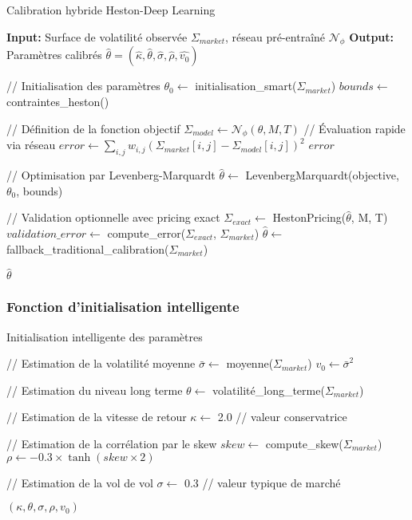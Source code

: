 \begin{algorithm}[H]
\caption{Calibration hybride Heston-Deep Learning}
\begin{algorithmic}
\STATE \textbf{Input:} Surface de volatilité observée $\Sigma_{market}$, réseau pré-entraîné $\mathcal{N}_\phi$
\STATE \textbf{Output:} Paramètres calibrés $\hat{\theta} = (\hat{\kappa}, \hat{\theta}, \hat{\sigma}, \hat{\rho}, \hat{v_0})$

\STATE // Initialisation des paramètres
\STATE $\theta_0 \leftarrow$ initialisation_smart($\Sigma_{market}$)
\STATE $bounds \leftarrow$ contraintes_heston()

\STATE // Définition de la fonction objectif
    \STATE $\Sigma_{model} \leftarrow \mathcal{N}_\phi(\theta, M, T)$ // Évaluation rapide via réseau
    \STATE $error \leftarrow \sum_{i,j} w_{i,j} (\Sigma_{market}[i,j] - \Sigma_{model}[i,j])^2$
    \RETURN $error$
\ENDFUNCTION

\STATE // Optimisation par Levenberg-Marquardt
\STATE $\hat{\theta} \leftarrow$ LevenbergMarquardt(objective, $\theta_0$, bounds)

\STATE // Validation optionnelle avec pricing exact
    \STATE $\Sigma_{exact} \leftarrow$ HestonPricing($\hat{\theta}$, M, T)
    \STATE $validation\_error \leftarrow$ compute\_error($\Sigma_{exact}$, $\Sigma_{market}$)
        \STATE $\hat{\theta} \leftarrow$ fallback\_traditional\_calibration($\Sigma_{market}$)
    \ENDIF
\ENDIF

\RETURN $\hat{\theta}$
\end{algorithmic}
\end{algorithm}

\subsubsection{Fonction d'initialisation intelligente}

\begin{algorithm}[H]
\caption{Initialisation intelligente des paramètres}
\begin{algorithmic}
    \STATE // Estimation de la volatilité moyenne
    \STATE $\bar{\sigma} \leftarrow$ moyenne($\Sigma_{market}$)
    \STATE $v_0 \leftarrow \bar{\sigma}^2$
    
    \STATE // Estimation du niveau long terme
    \STATE $\theta \leftarrow$ volatilité\_long\_terme($\Sigma_{market}$)
    
    \STATE // Estimation de la vitesse de retour
    \STATE $\kappa \leftarrow$ 2.0  // valeur conservatrice
    
    \STATE // Estimation de la corrélation par le skew
    \STATE $skew \leftarrow$ compute\_skew($\Sigma_{market}$)
    \STATE $\rho \leftarrow -0.3 \times \tanh(skew \times 2)$
    
    \STATE // Estimation de la vol de vol
    \STATE $\sigma \leftarrow$ 0.3  // valeur typique de marché
    
    \RETURN $(\kappa, \theta, \sigma, \rho, v_0)$
\ENDFUNCTION
\end{algorithmic}
\end{algorithm}

